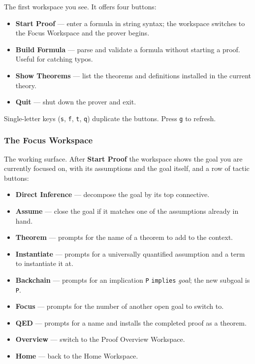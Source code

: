 The first workspace you see.  It offers four buttons:

\begin{itemize}
\item \textbf{Start Proof} --- enter a formula in string syntax; the
  workspace switches to the Focus Workspace and the prover begins.
\item \textbf{Build Formula} --- parse and validate a formula
  without starting a proof.  Useful for catching typos.
\item \textbf{Show Theorems} --- list the theorems and definitions
  installed in the current theory.
\item \textbf{Quit} --- shut down the prover and exit.
\end{itemize}

\noindent
Single-letter keys (\texttt{s}, \texttt{f}, \texttt{t}, \texttt{q})
duplicate the buttons.  Press \texttt{g} to refresh.

\subsubsection{The Focus Workspace}

The working surface.  After \textbf{Start Proof} the workspace shows
the goal you are currently focused on, with its assumptions and the
goal itself, and a row of tactic buttons:

\begin{itemize}
\item \textbf{Direct Inference} --- decompose the goal by its top
  connective.
\item \textbf{Assume} --- close the goal if it matches one of the
  assumptions already in hand.
\item \textbf{Theorem} --- prompts for the name of a theorem to add
  to the context.
\item \textbf{Instantiate} --- prompts for a universally quantified
  assumption and a term to instantiate it at.
\item \textbf{Backchain} --- prompts for an implication
  \texttt{P} \texttt{implies} \textit{goal}; the new subgoal is
  \texttt{P}.
\item \textbf{Focus} --- prompts for the number of another open
  goal to switch to.
\item \textbf{QED} --- prompts for a name and installs the
  completed proof as a theorem.
\item \textbf{Overview} --- switch to the Proof Overview Workspace.
\item \textbf{Home} --- back to the Home Workspace.
\end{itemize}

